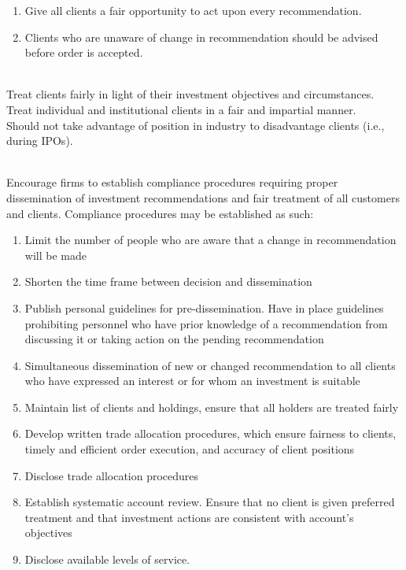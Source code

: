 \begin{remark} 
\begin{enumerate}[label=\roman*.]
\setlength{\itemsep}{0pt}
\item Give all clients a fair opportunity to act upon every recommendation.
\item Clients who are unaware of change in recommendation should be advised before order is accepted.
\end{enumerate}
\end{remark}

\begin{remark} \\
Treat clients fairly in light of their investment objectives and circumstances. Treat individual and institutional clients in a fair and impartial manner.\\
Should not take advantage of position in industry to disadvantage clients (i.e., during IPOs).
\end{remark}

\begin{remark} \\
Encourage firms to establish compliance procedures requiring proper dissemination of investment recommendations and fair treatment of all customers and clients. Compliance procedures may be established as such:
\begin{enumerate}[label=\roman*.]
\setlength{\itemsep}{0pt}
\item Limit the number of people who are aware that a change in recommendation will be made
\item Shorten the time frame between decision and dissemination
\item Publish personal guidelines for pre-dissemination. Have in place guidelines prohibiting personnel who have prior knowledge of a recommendation from discussing it or taking action on the pending recommendation
\item Simultaneous dissemination of new or changed recommendation to all clients who have expressed an interest or for whom an investment is suitable
\item Maintain list of clients and holdings, ensure that all holders are treated fairly
\item Develop written trade allocation procedures, which ensure fairness to clients, timely and efficient order execution, and accuracy of client positions
\item Disclose trade allocation procedures
\item Establish systematic account review. Ensure that no client is given preferred treatment and that investment actions are consistent with account's objectives
\item Disclose available levels of service.
\end{enumerate}
\end{remark}

